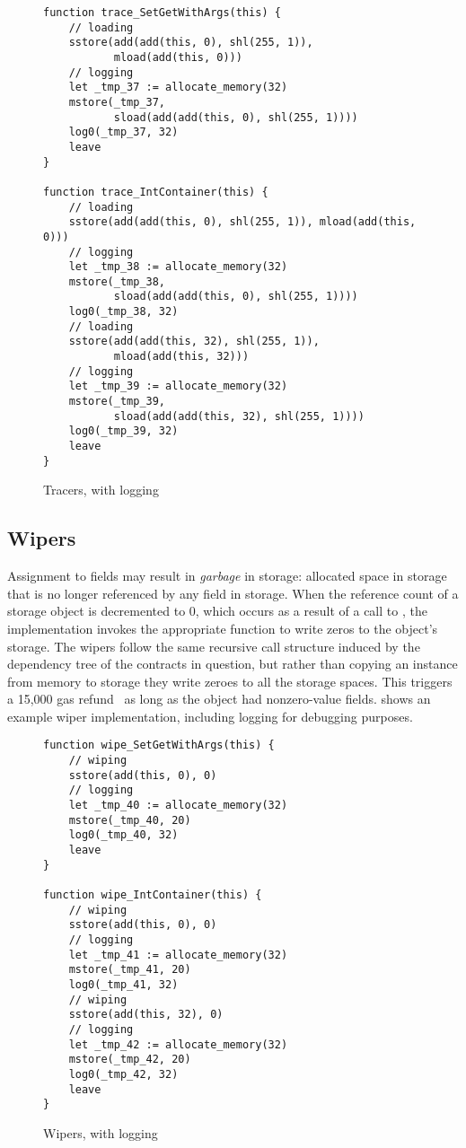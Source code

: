 \begin{figure}[hbtp]
    \caption{Tracers, with logging}
    \label{code.4}
    \begin{lstlisting}[language=yul,frame=single]
function trace_SetGetWithArgs(this) {
    // loading
    sstore(add(add(this, 0), shl(255, 1)), 
           mload(add(this, 0)))
    // logging
    let _tmp_37 := allocate_memory(32)
    mstore(_tmp_37, 
           sload(add(add(this, 0), shl(255, 1))))
    log0(_tmp_37, 32)
    leave
}

function trace_IntContainer(this) {
    // loading
    sstore(add(add(this, 0), shl(255, 1)), mload(add(this, 0)))
    // logging
    let _tmp_38 := allocate_memory(32)
    mstore(_tmp_38, 
           sload(add(add(this, 0), shl(255, 1))))
    log0(_tmp_38, 32)
    // loading
    sstore(add(add(this, 32), shl(255, 1)), 
           mload(add(this, 32)))
    // logging
    let _tmp_39 := allocate_memory(32)
    mstore(_tmp_39, 
           sload(add(add(this, 32), shl(255, 1))))
    log0(_tmp_39, 32)
    leave
}
    \end{lstlisting}
    \label{fig:tracers}
\end{figure}

\subsection{Wipers}
Assignment to fields may result in \emph{garbage} in storage: allocated space in storage that is no longer referenced by any field in storage. When the reference count of a storage object is decremented to 0, which occurs as a result of a call to , the  implementation invokes the appropriate  function to write zeros to the object's storage. The wipers follow the same recursive call structure induced by the
dependency tree of the contracts in question, but rather than copying an
instance from memory to storage they write zeroes to all the storage
spaces. This triggers a 15,000 gas refund~\cite{YellowPaper} as long as the object had nonzero-value fields.  shows an example wiper implementation, including logging for debugging purposes.

\begin{figure}[hbtp]
    \caption{Wipers, with logging}
    \label{code.5}
    \begin{lstlisting}[language=yul,frame=single]
function wipe_SetGetWithArgs(this) {
    // wiping
    sstore(add(this, 0), 0)
    // logging
    let _tmp_40 := allocate_memory(32)
    mstore(_tmp_40, 20)
    log0(_tmp_40, 32)
    leave
}

function wipe_IntContainer(this) {
    // wiping
    sstore(add(this, 0), 0)
    // logging
    let _tmp_41 := allocate_memory(32)
    mstore(_tmp_41, 20)
    log0(_tmp_41, 32)
    // wiping
    sstore(add(this, 32), 0)
    // logging
    let _tmp_42 := allocate_memory(32)
    mstore(_tmp_42, 20)
    log0(_tmp_42, 32)
    leave
}
    \end{lstlisting}
\end{figure}



